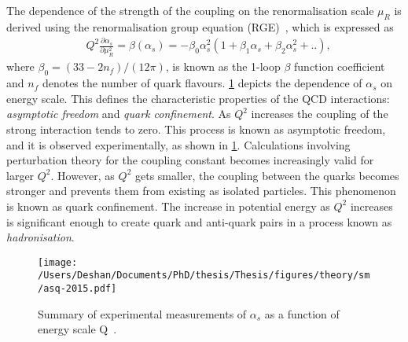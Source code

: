 The dependence of the strength of the coupling on the renormalisation scale $\mu_R$ is derived using the renormalisation group equation (RGE)~\cite{PDG}, which is expressed as
\begin{equation}
    \label{eq:rge}
    \begin{aligned}
        & Q^2 \frac{\partial\alpha_s}{\partial\mu_R^2} = \beta(\alpha_s) = -\beta_0\alpha_s^2(1+\beta_1\alpha_s + \beta_2\alpha_s^2+ ..),
     \end{aligned}
\end{equation}
where $\beta_0 = (33-2n_f)/(12\pi)$, is known as the 1-loop $\beta$ function coefficient and $n_f$ denotes the number of quark flavours. \cref{fig:alphasrun} depicts the dependence of $\alpha_s$ on energy scale. This defines the characteristic properties of the QCD interactions: \emph{asymptotic freedom} and \emph{quark confinement}. As $Q^2$ increases the coupling of the strong interaction tends to zero. This process is known as asymptotic freedom, and it is observed experimentally, as shown in \cref{fig:alphasrun}. Calculations involving perturbation theory for the coupling constant becomes increasingly valid for larger $Q^2$. However, as $Q^2$ gets smaller, the coupling between the quarks becomes stronger and prevents them from existing as isolated particles. This phenomenon is known as quark confinement. The increase in potential energy as $Q^2$ increases is significant enough to create quark and anti-quark pairs in a process known as \emph{hadronisation}.
\begin{figure}[!htpb]
    \centering
    \texttt{[image: /Users/Deshan/Documents/PhD/thesis/Thesis/figures/theory/sm/asq-2015.pdf]}
    \caption{Summary of experimental measurements of $\alpha_s$ as a function of energy scale Q~\cite{PDG}.}
    \label{fig:alphasrun}
\end{figure}

